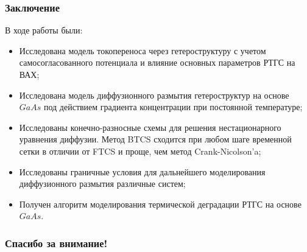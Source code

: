 \documentclass[10pt,pdf,hyperref={unicode},aspectratio={169}]{beamer}
\begin{document}
\begin{frame}
	\frametitle{Заключение}
	В ходе работы были:
	\begin{itemize}
		\item Исследована модель токопереноса через гетероструктуру с учетом самосогласованного потенциала и влияние основных параметров РТГС на ВАХ; 
		\item Исследована модель диффузионного размытия гетероструктур на основе $GaAs$ под действием градиента концентрации при постоянной температуре;
		\item Исследованы конечно-разносные схемы для решения нестационарного уравнения диффузии. Метод BTCS сходится при любом шаге временной сетки в отличии от FTCS и проще, чем метод Crank-Nicolson'a; 
		\item Исследованы граничные условия для дальнейшего моделирования диффузионного размытия различные систем; 
		\item Получен алгоритм моделирования термической деградации РТГС на основе $GaAs$.
	\end{itemize}
\end{frame}

\begin{frame}
	\frametitle{Спасибо за внимание!}
\end{frame}
\end{document}
